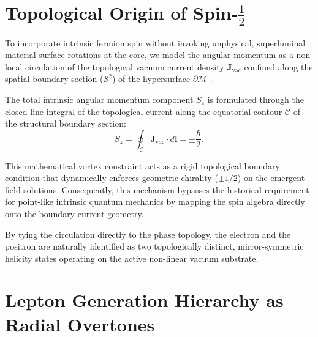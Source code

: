 \documentclass[
  reprint,
  aps,
  prd,
  twocolumn,
  superscriptaddress,
  nofootinbib,
  floatfix
]{revtex4-2}
\begin{document}
\section{Topological Origin of Spin-\texorpdfstring{$\frac{1}{2}$}{1/2}}
\label{sec:topological_spin}

To incorporate intrinsic fermion spin without invoking 
unphysical, superluminal material surface rotations at the 
core, we model the angular momentum as a non-local 
circulation of the topological vacuum current density 
$\mathbf{J}_{\text{vac}}$ confined along the spatial 
boundary section ($\mathcal{S}^2$) of the hypersurface 
$\partial\mathcal{M}$~\cite{Bekenstein1973}.


The total intrinsic angular momentum component $S_z$ is 
formulated through the closed line integral of the 
topological current along the equatorial contour $\mathcal{C}$ 
of the structural boundary section:
\begin{equation}
\label{eq:topological_vortex_spin}
S_z = \oint_{\mathcal{C}} \mathbf{J}_{\text{vac}} \cdot
d\mathbf{l} = \pm \frac{\hbar}{2}.
\end{equation}

This mathematical vortex constraint acts as a rigid topological 
boundary condition that dynamically enforces geometric chirality 
($\pm 1/2$) on the emergent field solutions. Consequently, 
this mechanism bypasses the historical requirement for 
point-like intrinsic quantum mechanics by mapping the spin 
algebra directly onto the boundary current geometry.

By tying the circulation directly to the phase topology, the 
electron and the positron are naturally identified as two 
topologically distinct, mirror-symmetric helicity states operating 
on the active non-linear vacuum substrate.

\section{Lepton Generation Hierarchy as Radial Overtones}
\label{sec:lepton_hierarchy}
\end{document}
